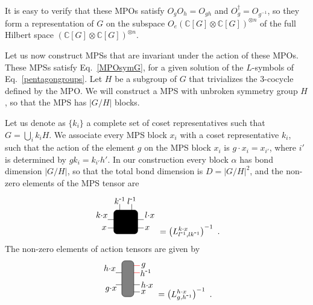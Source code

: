 \documentclass[a4paper,twocolumn,11pt,accepted=2023-02-10]{quantumarticle}
\newcommand{\myinv}[1]{#1^{\scalebox{0.9}[1.0]{-}1}}
\begin{document}
It is easy to verify that these MPOs satisfy $O_g O_h= O_{gh}$ and $O_g^\dagger =O_{g^{-1}}$, so they form a representation of $G$ on the subspace $O_e (\mathbb{C}[G]\otimes \mathbb{C}[G])^{\otimes n } $ of the full Hilbert space $(\mathbb{C}[G]\otimes \mathbb{C}[G]) ^{\otimes n }$.

Let us now construct MPSs that are invariant under the action of these MPOs.  These MPSs satisfy Eq.\ \eqref{MPOsymG}, for a given solution of the ${L}$-symbols of Eq.\ \eqref{pentagongroups}. Let $H$ be a subgroup of $G$ that trivializes the $3$-cocycle defined by the MPO. We will construct a MPS with unbroken symmetry group $H$, so that the MPS has $|G/H|$ blocks.

Let us denote as $\{k_i\}$ a complete set of coset representatives such that $G= \bigcup_i k_i H $. We associate every MPS block $x_i$ with a coset representative $k_i$, such that the action of the element $g$  on the MPS block $x_i$ is $g\cdot x_i = x_{i'}$, where ${i'}$ is determined by $gk_i = k_{i'} h'$.  In our construction every block $\alpha$ has bond dimension $|G/H|$, so that the total bond dimension is $D=|G/H|^2$, and the non-zero elements of the MPS tensor are
$$
\begin{tikzpicture}
\draw (-0.75, 0.1) -- (0.75, 0.1);
\node at (-1, 0.3) {${k}{\cdot} x$};
\node at (1, 0.3) {${l}{\cdot} x$};
\draw (-0.75, -0.25) -- (0.75, -0.25);
\node at (-0.9, -0.25) {$x$};
\node at (0.9, -0.25) {$x$};
\draw (-0.25, 0.75) -- (-0.25, 0);
\draw (0.25, 0.75) -- (0.25, 0);
\node at (-0.25, 0.9) {$\myinv{k}$};
\node at (0.25, 0.9) {$\myinv{l}$};
\draw[rounded corners, fill= black] (-0.5,-0.5) rectangle (0.5,0.5);
\end{tikzpicture}
= \left({L}^{{k}{\cdot} x}_{\myinv{l},l\myinv{k}} \right)^{-1} \ . 
$$
The non-zero elements of action tensors are given by 
$$
\begin{tikzpicture}
\draw (-0.5, 0.25) -- (0, 0.25);
\node at (-0.75, 0.45) {$h{\cdot} x$};
\draw (-0.5, -0.25) -- (0, -0.25);
\node at (-0.7, -0.45) {$g{\cdot} x$};
\draw[red] (0.5, 0.55) -- (0, 0.55);
\node at (0.65, 0.55) {$g$};
\draw[red] (0.5, 0.25) -- (0, 0.25);
\node at (0.75, 0.25) {$\myinv{h}$};
%
\draw (0.5, -0.55) -- (0, -0.55);
\node at (0.65, -0.55) {$x$};
\draw (0.5, -0.25) -- (0, -0.25);
\node at (0.8, -0.25) {$h{\cdot} x$};
\draw[rounded corners, fill=gray ] (-0.25,-0.75) rectangle (0.25,0.75);
\end{tikzpicture}
= \left({L}^{h{\cdot} x}_{g,\myinv{h}} \right)^{-1} \ .
$$
\end{document}
